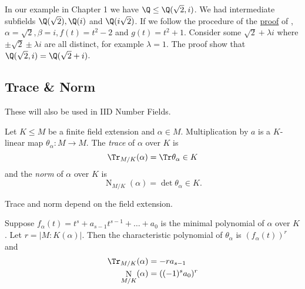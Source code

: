 \documentclass[a4paper]{article}
\DeclareMathOperator{\n}{N}
\begin{document}
\begin{ex}
  In our example in Chapter 1  we have \(\Q \leq \Q(\sqrt 2, i)\). We had intermediate subfields \(\Q(\sqrt 2), \Q(i)\) and \(\Q(i\sqrt 2)\). If we follow the procedure of the \hyperref[proof:primitive]{proof} of , \(\alpha = \sqrt 2, \beta = i, f(t) = t^2 - 2\) and \(g(t) = t^2 + 1\). Consider some \(\sqrt 2 + \lambda i\) where \(\pm \sqrt 2 \pm \lambda i\) are all distinct, for example \(\lambda = 1\). The proof show that \(\Q(\sqrt 2, i) = \Q(\sqrt 2 + i)\).
\end{ex}

\subsection{Trace \& Norm}

These will also be used in IID Number Fields.

\begin{definition}
  Let \(K \leq M\) be a finite field extension and \(\alpha \in M\). Multiplication by \(a\) is a \(K\)-linear map \(\theta_\alpha: M \to M\). The \emph{trace} of \(\alpha\) over \(K\) is
  \[
    \Tr_{M/K}(\alpha) = \Tr \theta_\alpha \in K
  \]
  and the \emph{norm} of \(\alpha\) over \(K\) is
  \[
    \n_{M/K}(\alpha) = \det \theta_\alpha \in K.
  \]
\end{definition}

\begin{note}
  Trace and norm depend on the field extension.
\end{note}

\begin{theorem}
  \label{thm:trace and norm}
  Suppose \(f_\alpha(t) = t^s + a_{s - 1}t^{s - 1} + \dots + a_0\) is the minimal polynomial of \(\alpha\) over \(K\). Let \(r = |M: K(\alpha)|\). Then the characteristic polynomial of \(\theta_\alpha\) is \((f_\alpha(t))^r\) and
  \begin{align*}
    \Tr_{M/K}(\alpha) &= -r a_{s-1} \\
    \n_{M/K}(\alpha) &= ((-1)^s a_0)^r
  \end{align*}
\end{theorem}
\end{document}
